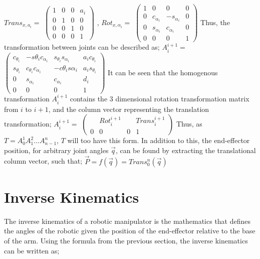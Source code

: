 \documentclass[12pt,openany,a4paper]{book}
\begin{document}
$Trans_{x, a_i} =$
$
 \left(\begin{array}{cccc} 1 & 0 & 0 & a_i\\ 0 & 1 & 0 & 0\\ 0 & 0 & 1 & 0\\ 0 & 0 & 0 & 1 \end{array}\right)
$
, 
$Rot_{x, \alpha_i} =$
$
 \left(\begin{array}{cccc} 1 & 0 & 0 & 0\\ 0 & c_{\alpha_i} & -s_{\alpha_i} & 0\\ 0 & s_{\alpha_i} & c_{\alpha_i} & 0\\ 0 & 0 & 0 & 1 \end{array}\right)
$
\vspace{\baselineskip}
Thus, the transformation between joints can be described as;
\vspace{\baselineskip}
$A_{i}^{i+1} = $
$ \left(\begin{array}{cccc} c_{\theta_i} & -s{\theta_i} c_{\alpha_i} & s_{\theta_i} s_{\alpha_i} & a_i c_{\theta_i}\\ s_{\theta_i} & c_{\theta_i}c_{\alpha_i} & -c{\theta_i}s{\alpha_i} & a_i s_{\theta_i}\\ 0 & s_{\alpha_i} & c_{\alpha_i} & d_i\\ 0 & 0 & 0 & 1 \end{array}\right)
$
\vspace{\baselineskip}
It can be seen that the homogenous transformation $A_{i}^{i+1}$ contains the 3 dimensional rotation transformation matrix from $i$ to $i+1$, and the column vector representing the translation transformation;
\vspace{\baselineskip}
$A_{i}^{i+1} = $
$ \left(\begin{array}{cccc} & Rot_{i}^{i+1} & & Trans_{i}^{i+1}  \\ 0 & 0 & 0 & 1 \end{array}\right)
$
\vspace{\baselineskip}
Thus, as $T = A_{0}^{1} A_{1}^{2} ... A_{n-1}^n$, $T$ will too have this form. In addition to this, the end-effector position, for arbitrary joint angles $\vec{q}$, can be found by extracting the translational column vector, such that;
\vspace{\baselineskip}
$\vec{P} = f( \vec{q} ) = Trans_{0}^{n} (\vec{q})$

\section{Inverse Kinematics}
The inverse kinematics of a robotic manipulator is the mathematics that defines the angles of the robotic given the position of the end-effector relative to the base of the arm. Using the formula from the previous section, the inverse kinematics can be written as;
\end{document}
